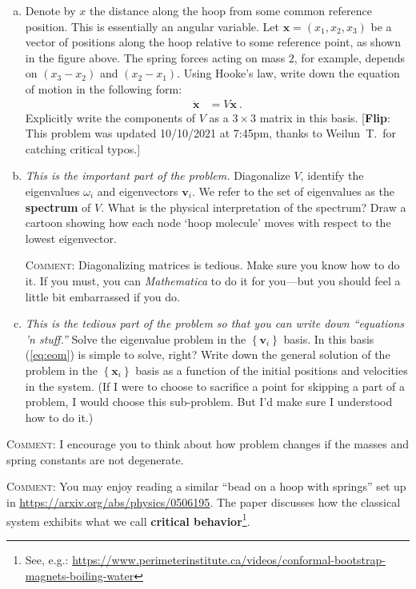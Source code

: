 \documentclass[12pt]{article}
\numberwithin{equation}{section}    %
\renewcommand{\vec}[1]{\mathbf{#1}} %
\newcommand{\flip}[1]{{\color{red} [\textbf{Flip}: {#1}]}}
\begin{document}
\begin{enumerate}[(a)]
	\item Denote by $x$ the distance along the hoop from some common reference position. This is essentially an angular variable. Let $\vec{x} = (x_1, x_2, x_3)$ be a vector of positions along the hoop relative to some reference point, as shown in the figure above. The spring forces acting on mass $2$, for example, depends on $(x_3-x_2)$ and $(x_2-x_1)$. Using Hooke's law, write down the equation of motion in the following form:
\begin{align}
	\ddot{\vec{x}} &= V \vec{x} \ .
	\label{eq:eom}
\end{align}
Explicitly write the components of $V$ as a $3\times 3$ matrix in this basis. \flip{This problem was updated 10/10/2021 at 7:45pm, thanks to Weilun~T.\ for catching critical typos.}

	\item 
\emph{This is the important part of the problem.}
Diagonalize $V$, identify the eigenvalues $\omega_i$ and eigenvectors $\vec{v}_i$. We refer to the set of eigenvalues as the \textbf{spectrum} of $V$. What is the physical interpretation of the spectrum? Draw a cartoon showing how each node `hoop molecule' moves with respect to the lowest eigenvector. 

\textsc{Comment}: Diagonalizing matrices is tedious. Make sure you know how to do it. If you must, you can \emph{Mathematica} to do it for you---but you should feel a little bit embarrassed if you do. 

\item 
\emph{This is the tedious part of the problem so that you can write down ``equations 'n stuff.''}
Solve the eigenvalue problem in the $\left\{ \vec{v}_i\right \}$ basis. In this basis (\ref{eq:eom}) is simple to solve, right? Write down the general solution of the problem in the $\left\{ \vec{x}_i\right \}$ basis as a function of the initial positions and velocities in the system.  (If I were to choose to sacrifice a point for skipping a part of a problem, I would choose this sub-problem. But I'd make sure I understood how to do it.)

\end{enumerate}

\textsc{Comment}: I encourage you to think about how problem changes if the masses and spring constants are not degenerate. 

\textsc{Comment}: You may enjoy reading a similar ``bead on a hoop with springs'' set up in \url{https://arxiv.org/abs/physics/0506195}. The paper discusses how the classical system exhibits what we call \textbf{critical behavior}\footnote{See, e.g.: \url{https://www.perimeterinstitute.ca/videos/conformal-bootstrap-magnets-boiling-water}}.
\end{document}
